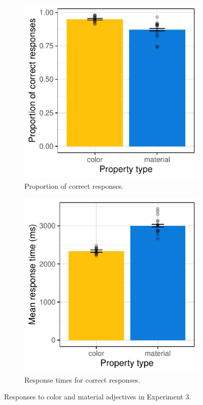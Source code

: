 \documentclass[12pt,letterpaper]{article}
\begin{document}
\begin{figure}[ht]
   \centering
   \begin{subfigure}{.4\textwidth}
   \centering
   \includegraphics[width=\textwidth]{plots/exp3_proportion.pdf}
   \caption{Proportion of correct responses.}
   \label{fig:exp3_a}
   \end{subfigure} \hspace{9mm}
   \begin{subfigure}{.4 \textwidth}
   \centering
   \includegraphics[width=\textwidth]{plots/exp3_rt.pdf}
   \caption{Response times for correct responses.}
   \label{fig:exp3_b}
   \end{subfigure}
   \caption{Responses to color and material adjectives in Experiment 3.}
   \label{fig:exp3}
\end{figure}   
\end{document}
